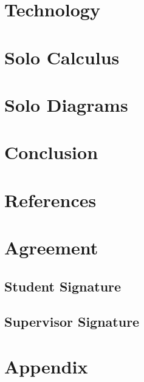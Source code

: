 \documentclass{article}
\begin{document}
    \section{Technology}

    \section{Solo Calculus}
        
        
        

    \section{Solo Diagrams}
        
        
        

    \section{Conclusion}

    \section{References}
        

    \section{Agreement}
        \subsection{Student Signature}
            \vspace{1in}

        \subsection{Supervisor Signature}
            \vspace{1in}

    \section{Appendix}
        
\end{document}

